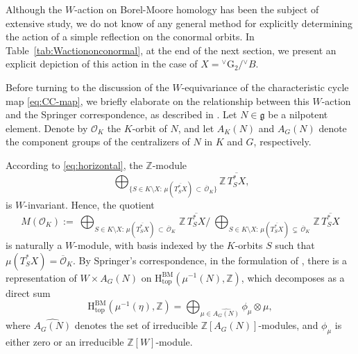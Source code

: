 \documentclass[a4paper, 11pt]{article}
\begin{document}
Although the $W$-action on Borel-Moore homology has been the subject
of extensive study, we do not know of any general method %
for explicitly determining the action of a simple reflection on the
conormal orbits. In Table~\ref{tab:Wactiononconormal}, at the end of
the next section, we present an explicit depiction of this action in
the case of $X={}^{\vee}\mathrm{G}_{2}/{}^{\vee}B$.  

Before turning to the discussion of the $W$-equivariance of the
characteristic cycle map \eqref{eq:CC-map}, we briefly elaborate on
the relationship between this $W$-action and the Springer
correspondence, as described in \cite[Section 4]{Rossmann91}. Let $N
\in \mathfrak{g}$ be a nilpotent element. Denote by $\mathcal{O}_K$
the $K$-orbit of $N$, and let $A_K(N)$ and $A_G(N)$ denote the
component groups of the centralizers of $N$ in $K$ and $G$,
respectively. 

According to  \eqref{eq:horizontal}, the $\mathbb{Z}$-module
\begin{equation}\label{eq:Z-module}
\
\bigoplus_{\{S\in K\setminus X:\,
  \mu\left(\overline{T_{S}^{\ast}X}\right)\, \subset\,
  \overline{\mathcal{O}}_{K} \}} \mathbb{Z} \, \overline{T_S^\ast X},
\end{equation}
is $W$-invariant. Hence, the quotient
\begin{equation}\label{eq:Z-module-quotient}
M(\mathcal{O}_K):=\
\bigoplus_{S\in K\setminus X:\,
  \mu\left(\overline{T^{\ast}_{S}X}\right)\, \subset\,
  \overline{\mathcal{O}}_{K}\,} \mathbb{Z}\, \overline{T_S^{\ast}X}/  
\ \bigoplus_{S\in K\setminus X:\,
  \mu\left(\overline{T^{\ast}_{S}X}\right)\, \varsubsetneq\,
  \overline{\mathcal{O}}_{K}\,} \mathbb{Z} \, \overline{T_S^{\ast}X}
\end{equation} 
is naturally a $W$-module, with basis indexed by the $K$-orbits $S$
such that $\mu(T_S^{\ast}X) = \overline{\mathcal{O}}_K$. 
By Springer's correspondence, in the formulation of \cite[Theorem
  4.1]{Rossmann91},  
there is a representation of $W \times A_G(N)$ on 
$\mathrm{H}_{\mathrm{top}}^{\mathrm{BM}}(\mu^{-1}(N),\mathbb{Z})$,
which decomposes as a direct sum
\begin{equation}\label{eq:Springer-representation}
\mathrm{H}_{\mathrm{top}}^{\mathrm{BM}}(\mu^{-1}(\eta),\mathbb{Z})=\bigoplus_{\mu\in
  \widehat{A_G(N)}} 
\phi_\mu\otimes \mu,
\end{equation}
where  $\widehat{A_G(N)}$ denotes the set of irreducible
$\mathbb{Z}[A_{G}(N)]$-modules, and $\phi_\mu$ is either zero or an
irreducible $\mathbb{Z}[W]$-module.
\end{document}
